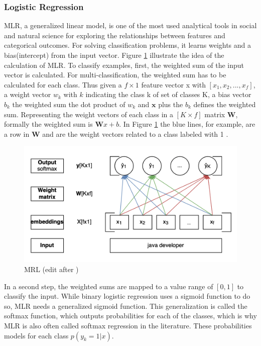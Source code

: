\documentclass[12pt, a4paper, titlepage]{article}
\begin{document}
\subsubsection{Logistic Regression}
\ac{MLR}, a generalized linear model, is one of the most used analytical tools in social and natural science for exploring the relationships between features and categorical outcomes. For solving classification problems, it learns weights and a bias(intercept) from the input vector. Figure \ref{fig: F7} illustrate the idea of the calculation of \ac{MLR}. To classify examples, first, the weighted sum of the input vector is calculated. For multi-classification, the weighted sum has to be calculated for each class. Thus given a $f \times 1$ feature vector x with $[x_1, x_2, ..., x_f]$, a weight vector $w_k$ with $k$ indicating the class k of set of classes K, a bias vector $b_k$ the weighted sum the dot product of $w_k$ and $\textbf{x}$ plus the $b_k$ defines the weighted sum. Representing the weight vectors of each class in a $[K \times f]$ matrix $\textbf{W}$, formally the weighted sum is $\textbf{W}x+b$. In Figure \ref{fig: F7} the blue lines, for example, are a row in $\textbf{W}$ and are the weight vectors related to a class labeled with 1 \citep{jurafsky2021}.

\begin{figure}[hb!]
  \center
  \includegraphics[scale=0.5]{LR.png}
  \caption[MLR]{\label{fig: F7} MRL (edit after \citep[p.]{jurafsky2021})}
\end{figure}

In a second step, the weighted sums are mapped to a value range of $[0,1]$ to classify the input. While binary logistic regression uses a sigmoid function to do so, \ac{MLR} needs a generalized sigmoid function. This generalization is called the softmax function, which outputs probabilities for each of the classes, which is why \ac{MLR} is also often called softmax regression in the literature. These probabilities models for each class $p(y_k = 1|x)$.
\end{document}
